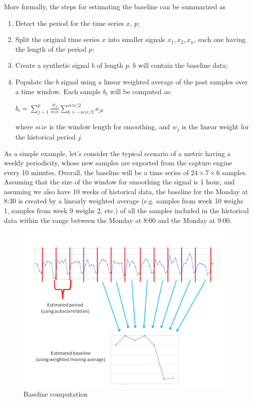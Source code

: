 \documentclass[12pt,a4paper,cucitura]{toptesi}
\begin{document}
More formally, the steps for estimating the baseline can be summarized as


\begin{enumerate}
\item Detect the period for the time series $x$, $p$;
\item Split the original time series $x$ into smaller signals $x_1, x_2, x_n$, each one having the length of the period $p$; 
\item Create a synthetic signal $b$ of length $p$. $b$ will contain the baseline data;
\item Populate the $b$ signal using a linear weighted average of the past samples over a time window. Each sample $b_i$ will be computed as:

\begin{center}
\Large
$b_i = \sum_{j = 1}^{p}{\frac{w_j}{size}\sum_{k = - size/2}^{size/2}{x_{jk}}}$
\end{center}

where $size$ is the window length for smoothing, and $w_j$ is the linear weight for the historical period $j$.
\end{enumerate}

As a simple example, let's consider the typical scenario of a metric having a weekly periodicity, whose new samples are exported from the capture engine every 10 minutes. Overall, the baseline will be a time series of $24\times7\times6$ samples. Assuming that the size of the window for smoothing the signal is 1 hour, and assuming we also have 10 weeks of historical data, the baseline for the Monday at 8:30 is created by a linearly weighted average (e.g. samples from week 10 weighs 1, samples from week 9 weighs 2, etc.) of all the samples included in the historical data within the range between the Monday at 8:00 and the Monday at 9:00.

\begin{figure}
\centering
\includegraphics[width=\linewidth]{baseline.png}
\caption{Baseline computation}
\end{figure}
\end{document}
